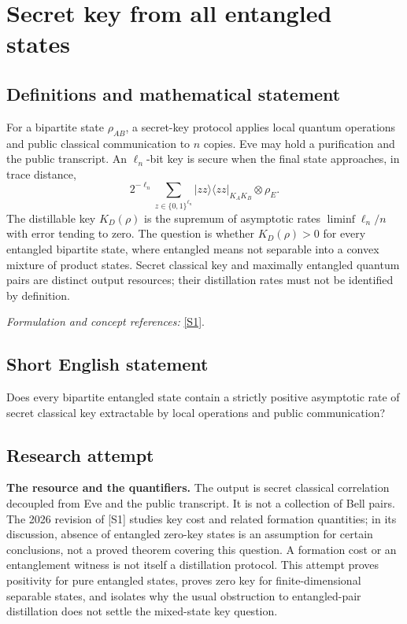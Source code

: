 \documentclass[11pt]{article}
\begin{document}
\section*{\texorpdfstring{Secret key from all entangled states}{Secret key from all entangled states}}\label{statement}
\subsection{Definitions and mathematical statement}
For a bipartite state $\rho_{AB}$, a secret-key protocol applies local quantum operations and public classical communication to $n$ copies. Eve may hold a purification and the public transcript. An $\ell_n$-bit key is secure when the final state approaches, in trace distance,
\[
 2^{-\ell_n}\sum_{z\in\{0,1\}^{\ell_n}}|zz\rangle\langle zz|_{K_AK_B}\otimes\rho_E.
\]
The distillable key $K_D(\rho)$ is the supremum of asymptotic rates $\liminf\ell_n/n$ with error tending to zero. The question is whether $K_D(\rho)>0$ for every entangled bipartite state, where entangled means not separable into a convex mixture of product states. Secret classical key and maximally entangled quantum pairs are distinct output resources; their distillation rates must not be identified by definition.
\par\smallskip\textit{Formulation and concept references:} \href{https://arxiv.org/html/2402.17007}{[S1]}.

\subsection{Short English statement}
Does every bipartite entangled state contain a strictly positive asymptotic rate of secret classical key extractable by local operations and public communication?
\subsection{Research attempt}
\textbf{The resource and the quantifiers.}
The output is secret classical correlation decoupled from Eve and the public
transcript.  It is not a collection of Bell pairs.  The 2026 revision of [S1]
studies key cost and related formation quantities; in its discussion, absence
of entangled zero-key states is an assumption for certain conclusions, not a
proved theorem covering this question.  A formation cost or an entanglement
witness is not itself a distillation protocol.  This attempt proves positivity
for pure entangled states, proves zero key for finite-dimensional separable
states, and isolates why the usual obstruction to entangled-pair distillation
does not settle the mixed-state key question.
\end{document}
